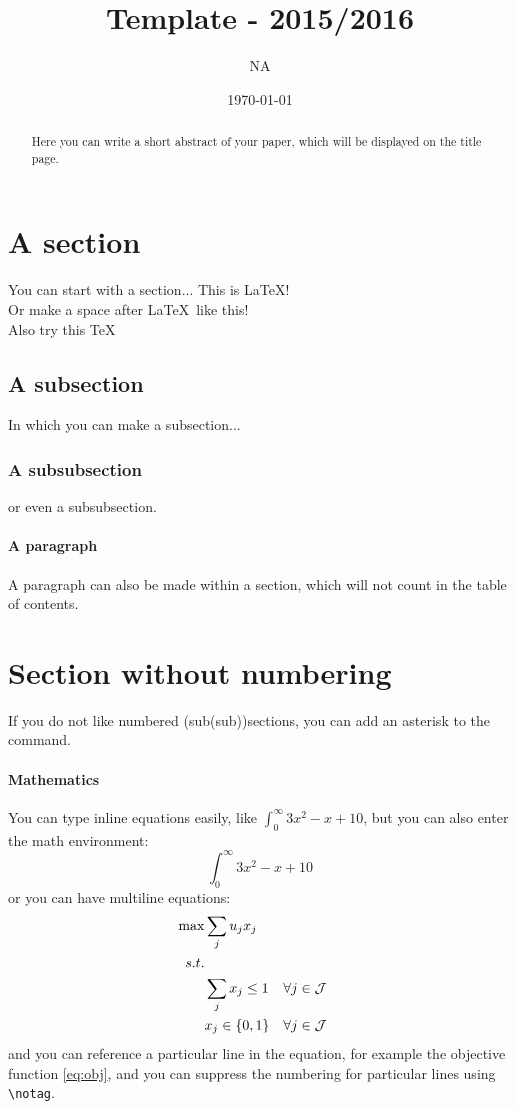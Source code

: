 \documentclass[a4paper,11pt]{article}
\title{Template - 2015/2016}
\author{NA}
\date{\today}
\begin{document}
\maketitle


\begin{abstract}
Here you can write a short abstract of your paper, which will be displayed on the title page.
\end{abstract}

\section{A section}
You can start with a section... This is \LaTeX! \\      %
Or make a space after \LaTeX\ like this! \\
Also try this \TeX

\subsection{A subsection}
In which you can make a subsection...

\subsubsection{A subsubsection}
or even a subsubsection.

\paragraph{A paragraph}
A paragraph can also be made within a section, which will not count in the table of contents.

\section*{Section without numbering}
If you do not like numbered (sub(sub))sections, you can add an asterisk to the command.

\paragraph{Mathematics}
You can type inline equations easily, like $\int_0^\infty 3x^2-x+10$, but you can also enter the math environment:
\[
\int_0^\infty 3x^2-x+10
\]
or you can have multiline equations:
\begin{align}
\max & \sum_{j} u_{j} x_{j} \label{eq:obj}\\
s.t. & \notag \\
&\sum_{j} x_{j} \leq 1 &&\forall j \in \mathcal{J} \label{eq:xonce}\\
&x_{j} \in \{0,1\} &&\forall j \in \mathcal{J} \label{eq:binarydecvar}
\end{align}
and you can reference a particular line in the equation, for example the objective function \eqref{eq:obj}, and you can suppress the numbering for particular lines using \texttt{\textbackslash notag}.
\end{document}
